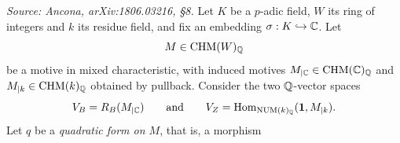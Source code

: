 \begin{theorem}
  \label{thm:mainthm}
  \textit{Source: Ancona, arXiv:1806.03216, §8.}
  Let \(K\) be a \(p\)-adic field, \(W\) its ring of integers and \(k\) its
  residue field, and fix an embedding \(\sigma : K \hookrightarrow \mathbb{C}\). Let
  \[M \in \mathrm{CHM}(W)_{\mathbb{Q}}\]
  be a motive in mixed characteristic, with induced motives
  \(M_{\vert\mathbb{C}} \in \mathrm{CHM}(\mathbb{C})_{\mathbb{Q}}\) and \(M_{\vert{k}} \in \mathrm{CHM}(k)_{\mathbb{Q}}\) obtained by
  pullback. Consider the two \(\mathbb{Q}\)-vector spaces
  \[V_B = R_B(M_{\vert\mathbb{C}}) \qquad \text{and} \qquad
    V_Z = \mathrm{Hom}_{\mathrm{NUM}(k)_{\mathbb{Q}}}(\mathbf{1}, M_{\vert{k}}).\]
  Let \(q\) be a \emph{quadratic form on \(M\)}, that is, a morphism

\end{theorem}
